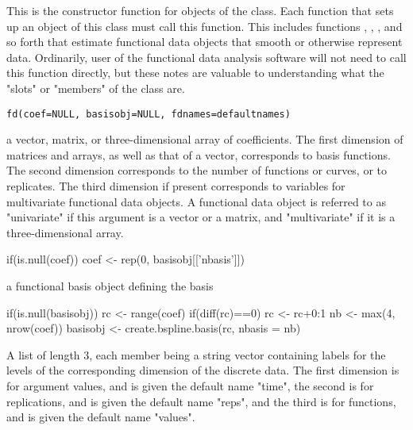 \begin{Description}\relax
This is the constructor function for objects of the  class.
Each function that sets up an object of this class must call this
function.  This includes functions ,
, , and so forth that estimate
functional data objects that smooth or otherwise represent data.
Ordinarily, user of the functional data analysis software will not
need to call this function directly, but these notes are valuable to
understanding what the "slots" or "members" of the  class
are.
\end{Description}
\begin{Usage}
\begin{verbatim}
fd(coef=NULL, basisobj=NULL, fdnames=defaultnames)
\end{verbatim}
\end{Usage}
\begin{Arguments}
\begin{ldescription}
\item[\code{coef}] a vector, matrix, or three-dimensional array of coefficients.  The
first dimension of matrices and arrays, as well as that of a vector,
corresponds to basis functions.  The second dimension corresponds to
the number of functions or curves, or to replicates.  The third
dimension if present corresponds to variables for multivariate
functional data objects.  A functional data object is referred to as
"univariate" if this argument is a vector or a matrix, and
"multivariate" if it is a three-dimensional array.

if(is.null(coef)) coef <- rep(0, basisobj[['nbasis']]) 

\item[\code{basisobj}] a functional basis object defining the basis

if(is.null(basisobj)){
rc <- range(coef)
if(diff(rc)==0) rc <- rc+0:1
nb <- max(4, nrow(coef)) 
basisobj <- create.bspline.basis(rc, nbasis = nb)
}

\item[\code{fdnames}] A list of length 3, each member being a string vector containing
labels for the levels of the corresponding dimension of the discrete
data.  The first dimension is for argument values, and is given the
default name "time", the second is for replications, and is given
the default name "reps", and the third is for functions, and is
given the default name "values".  

\end{ldescription}
\end{Arguments}
